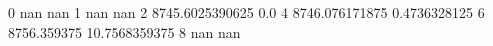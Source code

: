 0 nan nan
1 nan nan
2 8745.6025390625 0.0
4 8746.076171875 0.4736328125
6 8756.359375 10.7568359375
8 nan nan
